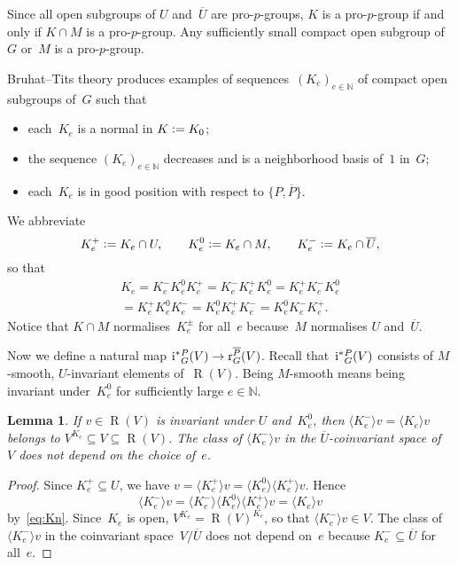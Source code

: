 \documentclass{amsart}
\newtheorem{lem}[theorem]{Lemma}
\theoremstyle{remark}
\theoremstyle{definition}
\DeclareMathOperator{\Rough}{R}%
\newcommand*{\Jact}{\textup i^*{}}%
\newcommand*{\Jacr}{\textup r}%
\newcommand*{\nb}{\nobreakdash}%
\newcommand*{\defeq}{\mathrel{\vcentcolon=}}%
\newcommand*{\idem}[1]{\langle#1\rangle}%
\newcommand*{\opp}[1]{\overline{#1}}%
\newcommand*{\N}{\mathbb N}%
\begin{document}
Since all open subgroups of \(U\) and~\(\opp{U}\) are pro-\(p\)-groups, \(K\) is a pro-\(p\)-group if and only if \(K\cap M\) is a pro-\(p\)-group.  Any sufficiently small compact open subgroup of \(G\) or~\(M\) is a pro-\(p\)-group.

Bruhat--Tits theory produces examples of sequences~\((K_e)_{e\in\N}\) of compact open subgroups of~\(G\) such that
\begin{itemize}
\item each~\(K_e\) is a normal in \(K \defeq K_0\);
\item the sequence \((K_e)_{e\in\N}\) decreases and is a neighborhood basis of~\(1\) in~\(G\);
\item each~\(K_e\) is in good position with respect to \(\{P,\opp{P}\}\).
\end{itemize}
We abbreviate
\[
K^+_e \defeq K_e \cap U,\qquad
K^0_e \defeq K_e \cap M,\qquad
K^-_e \defeq K_e \cap \opp{U},
\]
so that
\begin{multline}
  \label{eq:Kn}
  K_e = K_e^- K_e^0 K_e^+
  = K_e^- K_e^+ K_e^0
  = K_e^+ K_e^- K_e^0
  \\= K_e^+ K_e^0 K_e^-
  = K_e^0 K_e^+ K_e^-
  = K_e^0 K_e^- K_e^+.
\end{multline}
Notice that \(K \cap M\) normalises~\(K_e^\pm\) for all~\(e\) because~\(M\) normalises \(U\) and~\(\opp{U}\).

Now we define a natural map \(\Jact_G^P(V) \to \Jacr_G^{\opp{P}}(V)\).  Recall that~\(\Jact_G^P(V)\) consists of \(M\)\nb-smooth, \(U\)\nb-invariant elements of~\(\Rough(V)\).  Being \(M\)\nb-smooth means being invariant under~\(K_e^0\) for sufficiently large \(e\in\N\).

\begin{lem}
  \label{lem:invariance_average}
  If \(v\in \Rough(V)\) is invariant under \(U\) and~\(K_e^0\), then \(\idem{K_e^-}v = \idem{K_e}v\) belongs to \(V^{K_e}\subseteq V\subseteq \Rough(V)\).  The class of \(\idem{K_e^-}v\) in the \(\opp{U}\)\nb-coinvariant space of~\(V\) does not depend on the choice of~\(e\).
\end{lem}

\begin{proof}
  Since \(K_e^+\subseteq U\), we have \(v = \idem{K_e^+}v = \idem{K_e^0} \idem{K_e^+}v\).  Hence
  \[
  \idem{K_e^-}v = \idem{K_e^-} \idem{K_e^0} \idem{K_e^+} v = \idem{K_e}v
  \]
  by~\eqref{eq:Kn}.  Since~\(K_e\) is open, \(V^{K_e} = \Rough(V)^{K_e}\), so that \(\idem{K_e^-}v \in V\).  The class of \(\idem{K_e^-}v\) in the coinvariant space~\(V/\opp{U}\) does not depend on~\(e\) because \(K_e^-\subseteq\opp{U}\) for all~\(e\).
\end{proof}
\end{document}
